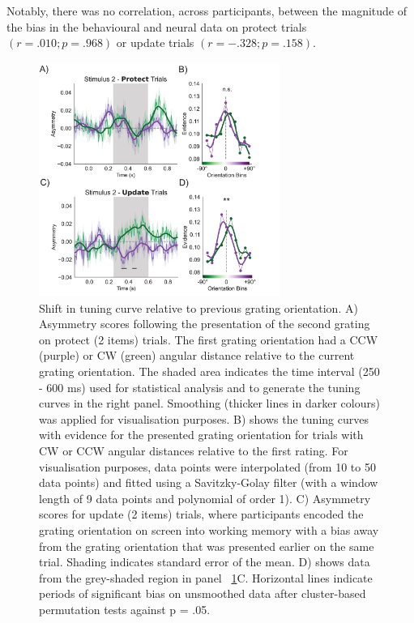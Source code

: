\documentclass{article}
\begin{document}
Notably, there was no correlation, across participants, between the magnitude of the bias in the behavioural and neural data on protect trials $(r = .010; p = .968)$ or update trials $(r = -.328; p = .158)$.\\


\begin{figure}
\centering\includegraphics[width=0.7\textwidth]{figures/figure5_within_trial_decoding} 
\caption[Shift in tuning curve relative to previous grating orientation. ]{Shift in tuning curve relative to previous grating orientation. A) Asymmetry scores following the presentation of the second grating on protect (2 items) trials. The first grating orientation had a CCW (purple) or CW (green) angular distance relative to the current grating orientation. The shaded area indicates the time interval (250 - 600 ms) used for statistical analysis and to generate the tuning curves in the right panel. Smoothing (thicker lines in darker colours) was applied for visualisation purposes. B) shows the tuning curves with evidence for the presented grating orientation for trials with CW or CCW angular distances relative to the first rating. For visualisation purposes, data points were interpolated (from 10 to 50 data points) and fitted using a Savitzky-Golay filter (with a window length of 9 data points and polynomial of order 1). C) Asymmetry scores for update (2 items) trials, where participants encoded the grating orientation on screen into working memory with a bias away from the grating orientation that was presented earlier on the same trial. Shading indicates standard error of the mean. D) shows data from the grey-shaded region in panel ~\ref{fig:within_decoding}C. Horizontal lines indicate periods of significant bias on unsmoothed data after cluster-based permutation tests against p = .05. }
\label{fig:within_decoding}\end{figure}
\end{document}

